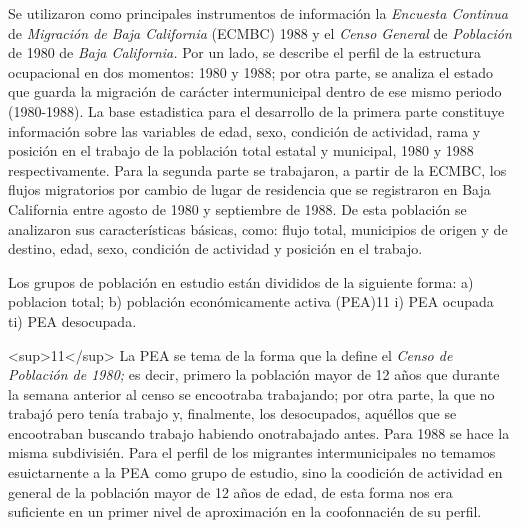 \documentclass{article}
\begin{document}
Se utilizaron como principales instrumentos de información la \textit{Encuesta Continua} de \textit{Migración de Baja California} (ECMBC) 1988 y el \textit{Censo General}  de \textit{Población} de 1980 de \textit{Baja California.} Por un lado, se describe el perfil de la estructura ocupacional en dos momentos: 1980 y 1988; por otra parte, se analiza el estado que guarda la migración de carácter intermunicipal dentro de ese mismo periodo (1980-1988). La base estadistica para el desarrollo de la primera parte constituye información sobre las variables de edad, sexo, condición de actividad, rama y posición en el trabajo de la población total estatal y municipal, 1980 y 1988 respectivamente. Para la segunda parte se trabajaron, a partir de la ECMBC, los flujos migratorios por cambio de lugar de residencia que se registraron en Baja California entre agosto de 1980 y septiembre de 1988. De esta población se analizaron sus características básicas, como: flujo total, municipios de origen y de destino, edad, sexo, condición de actividad y posición en el trabajo.

Los grupos de población en estudio están divididos de la siguiente forma: a) poblacion total; b) población económicamente activa (PEA)11 i) PEA ocupada ti) PEA desocupada.

<sup>11</sup> La PEA se tema de la forma que la define el \textit{Censo de Población de 1980;} es decir, primero la población mayor de 12 años que durante la semana anterior al censo se encootraba trabajando; por otra parte, la que no trabajó pero tenía trabajo y, finalmente, los desocupados, aquéllos que se encootraban buscando trabajo habiendo onotrabajado antes. Para 1988 se hace la misma subdivisién. Para el perfil de los migrantes intermunicipales no temamos esuictarnente a la PEA como grupo de estudio, sino la coodición de actividad en general de la población mayor de 12 años de edad, de esta forma nos era suficiente en un primer nivel de aproximación en la coofonnacién de su perfil.
\end{document}
